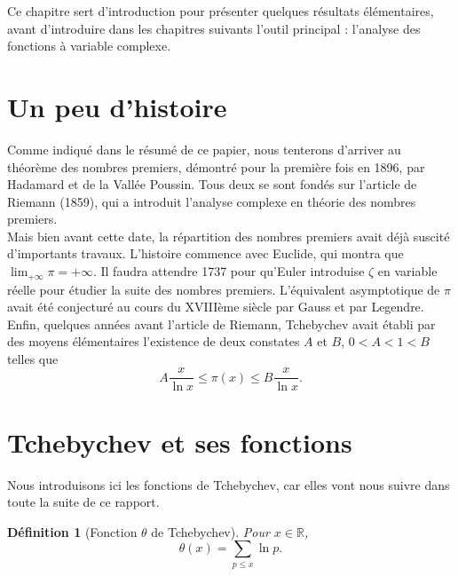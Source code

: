 \documentclass[french]{report}
\newtheorem{definition}[theorem]{Définition}
\begin{document}
Ce chapitre sert d'introduction pour présenter quelques résultats élémentaires, avant d'introduire dans les chapitres suivants l'outil principal : l'analyse des fonctions à variable complexe.

\section{Un peu d'histoire}

Comme indiqué dans le résumé de ce papier, nous tenterons d'arriver au théorème des nombres premiers, démontré pour la première fois en 1896, par Hadamard et de la Vallée Poussin. Tous deux se sont fondés sur l'article \cite{riemann} de Riemann (1859), qui a introduit l'analyse complexe en théorie des nombres premiers.
\\

Mais bien avant cette date, la répartition des nombres premiers avait déjà suscité d'importants travaux. L'histoire commence avec Euclide, qui montra que $\lim_{+\infty}\pi=+\infty$. Il faudra attendre 1737 pour qu'Euler introduise $\zeta$ en variable réelle pour étudier la suite des nombres premiers. L'équivalent asymptotique de $\pi$ avait été conjecturé au cours du XVIIIème siècle par Gauss et par Legendre. Enfin, quelques années avant l'article de Riemann, Tchebychev avait établi par des moyens élémentaires l'existence de deux constates $A$ et $B$, $0<A<1<B$ telles que
\[
  A\frac{x}{\ln x}\leq\pi(x)\leq B\frac{x}{\ln x}.
\]

\section{Tchebychev et ses fonctions}

Nous introduisons ici les fonctions de Tchebychev, car elles vont nous suivre dans toute la suite de ce rapport.

\begin{definition}[Fonction $\theta$ de Tchebychev] Pour $x\in \mathbb{R}$,
  \[ \theta(x) = \sum_{p \le x}\ln p. \]
\end{definition}
\end{document}
